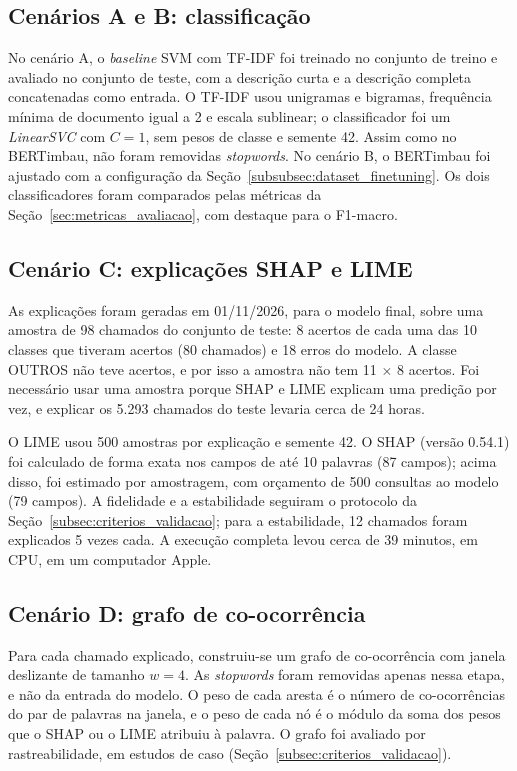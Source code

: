 \documentclass[
    12pt,                %
    openright,           %
    oneside,             %
    a4paper,             %
    english,             %
    brazil               %
]{abntex2}
\begin{document}
\subsection{Cenários A e B: classificação}

No cenário A, o \textit{baseline} SVM com TF-IDF foi treinado no conjunto de treino e avaliado no conjunto de teste, com a descrição curta e a descrição completa concatenadas como entrada. O TF-IDF usou unigramas e bigramas, frequência mínima de documento igual a 2 e escala sublinear; o classificador foi um \textit{LinearSVC} com $C = 1$, sem pesos de classe e semente 42. Assim como no BERTimbau, não foram removidas \textit{stopwords}.
No cenário B, o BERTimbau foi ajustado com a configuração da Seção~\ref{subsubsec:dataset_finetuning}. Os dois classificadores foram comparados pelas métricas da Seção~\ref{sec:metricas_avaliacao}, com destaque para o F1-macro.

\subsection{Cenário C: explicações SHAP e LIME}

As explicações foram geradas em 01/11/2026, para o modelo final, sobre uma amostra de 98 chamados do conjunto de teste: 8 acertos de cada uma das 10 classes que tiveram acertos (80 chamados) e 18 erros do modelo. A classe OUTROS não teve acertos, e por isso a amostra não tem 11 $\times$ 8 acertos. Foi necessário usar uma amostra porque SHAP e LIME explicam uma predição por vez, e explicar os 5.293 chamados do teste levaria cerca de 24 horas.

O LIME usou 500 amostras por explicação e semente 42. O SHAP (versão 0.54.1) foi calculado de forma exata nos campos de até 10 palavras (87 campos); acima disso, foi estimado por amostragem, com orçamento de 500 consultas ao modelo (79 campos). A fidelidade e a estabilidade seguiram o protocolo da Seção~\ref{subsec:criterios_validacao}; para a estabilidade, 12 chamados foram explicados 5 vezes cada. A execução completa levou cerca de 39 minutos, em CPU, em um computador Apple.

\subsection{Cenário D: grafo de co-ocorrência}

Para cada chamado explicado, construiu-se um grafo de co-ocorrência com janela deslizante de tamanho $w = 4$. As \textit{stopwords} foram removidas apenas nessa etapa, e não da entrada do modelo. O peso de cada aresta é o número de co-ocorrências do par de palavras na janela, e o peso de cada nó é o módulo da soma dos pesos que o SHAP ou o LIME atribuiu à palavra. O grafo foi avaliado por rastreabilidade, em estudos de caso (Seção~\ref{subsec:criterios_validacao}).
\end{document}

